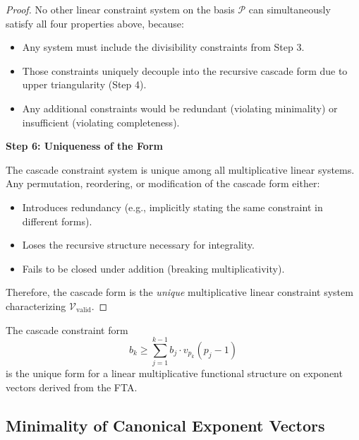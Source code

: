 \begin{proof}
No other linear constraint system on the basis $\mathcal{P}$ can simultaneously satisfy all four properties above, because:
\begin{itemize}
\item Any system must include the divisibility constraints from Step 3.
\item Those constraints uniquely decouple into the recursive cascade form due to upper triangularity (Step 4).
\item Any additional constraints would be redundant (violating minimality) or insufficient (violating completeness).
\end{itemize}

\noindent \textbf{Step 6: Uniqueness of the Form}

The cascade constraint system is unique among all multiplicative linear systems. Any permutation, reordering, or modification of the cascade form either:
\begin{itemize}
\item Introduces redundancy (e.g., implicitly stating the same constraint in different forms).
\item Loses the recursive structure necessary for integrality.
\item Fails to be closed under addition (breaking multiplicativity).
\end{itemize}

Therefore, the cascade form is the \emph{unique} multiplicative linear constraint system characterizing $\mathcal{V}_{\text{valid}}$.

\end{proof}

\noindent The cascade constraint form
\begin{equation}
b_k \geq \sum_{j=1}^{k-1} b_j \cdot v_{p_k}(p_j - 1)
\end{equation}
is the unique form for a linear multiplicative functional structure on exponent vectors derived from the FTA.

\subsection{Minimality of Canonical Exponent Vectors}
\label{subsec:minimal-representation}

